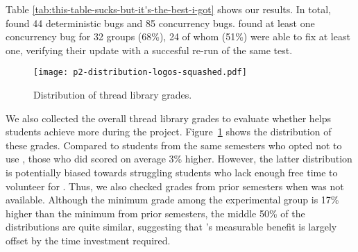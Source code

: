 Table \ref{tab:this-table-sucks-but-it's-the-best-i-got} shows our results.
In total, \landslide found 44 deterministic bugs and 85 concurrency bugs.
\landslide found at least one concurrency bug for 32 groups (68\%),
24 of whom (51\%) were able to fix at least one,
verifying their update with a succesful re-run of the same test.

\begin{figure}[t]
	\texttt{[image: p2-distribution-logos-squashed.pdf]}
	\caption{Distribution of thread library grades.}
	\label{fig:p2-distribution}
\end{figure}
We also collected the overall thread library grades to evaluate whether \landslide helps students achieve more during the project.
Figure~\ref{fig:p2-distribution} shows the distribution of these grades.
Compared to students from the same semesters who opted not to use \landslide,
those who did scored on average 3\% higher. %
%
However, the latter distribution is potentially biased towards struggling students
who lack enough free time to volunteer for \landslide.
Thus, we also checked grades from prior semesters when \landslide was not available.
Although the minimum grade among the experimental group is 17\% higher than the minimum from prior semesters,
the middle 50\% of the distributions are quite similar,
suggesting that \landslide's measurable benefit is largely offset by the time investment required.
%
